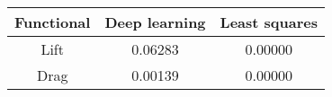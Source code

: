 \begin{tabular}{|c|c|c|}
\hline
Functional&Deep learning&Least squares\\ 
\hline

Lift & 0.06283 & 0.00000\\ 
\hline
Drag & 0.00139 & 0.00000\\ 
\hline
\end{tabular}

